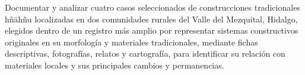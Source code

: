 



Documentar y analizar cuatro casos seleccionados de construcciones tradicionales hñähñu localizadas en dos comunidades rurales del Valle del Mezquital, Hidalgo, elegidos dentro de un registro más amplio por representar sistemas constructivos originales en su morfología y materiales tradicionales, mediante fichas descriptivas, fotografías, relatos y cartografía, para identificar su relación con materiales locales y sus principales cambios y permanencias.

